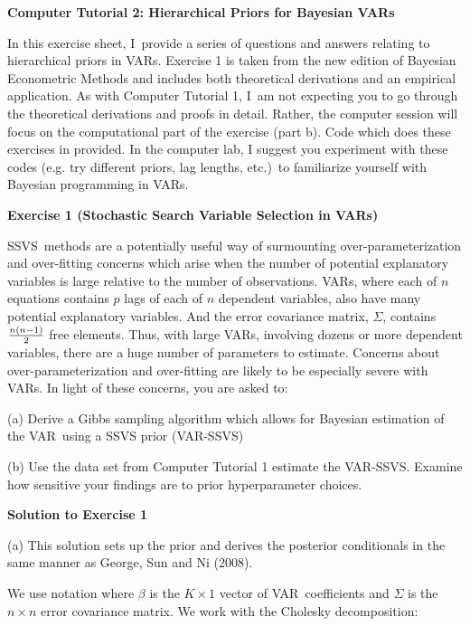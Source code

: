 \documentclass{article}
\begin{document}
\begin{center}
\textbf{Computer Tutorial 2: Hierarchical Priors for Bayesian VARs}
\end{center}

In this exercise sheet, I\ provide a series of questions and answers
relating to hierarchical priors in VARs. Exercise 1 is taken from the new
edition of Bayesian Econometric Methods and includes both theoretical
derivations and an empirical application. As with Computer Tutorial 1, I\ am
not expecting you to go through the theoretical derivations and proofs in
detail. Rather, the computer session will focus on the computational part of
the exercise (part b). Code which does these exercises in provided. In the
computer lab, I suggest you experiment with these codes (e.g. try different
priors, lag lengths, etc.)\ to familiarize yourself with Bayesian
programming in VARs.

\newpage

\textbf{Exercise 1 (Stochastic Search Variable Selection in VARs)}

SSVS\ methods are a potentially useful way of surmounting
over-parameterization and over-fitting concerns which arise when the number
of potential explanatory variables is large relative to the number of
observations. VARs, where each of $n$ equations contains $p$ lags of each of 
$n$ dependent variables, also have many potential explanatory variables. And
the error covariance matrix, $\Sigma $, contains $\frac{n\left( n-1\right) }{%
2}$ free elements. Thus, with large VARs, involving dozens or more dependent
variables, there are a huge number of parameters to estimate. Concerns about
over-parameterization and over-fitting are likely to be especially severe
with VARs. In light of these concerns, you are asked to:

(a) Derive a Gibbs sampling algorithm which allows for Bayesian estimation
of the VAR\ using a SSVS prior (VAR-SSVS)

(b) Use the data set from Computer Tutorial 1 estimate the VAR-SSVS. Examine
how sensitive your findings are to prior hyperparameter choices.

\textbf{Solution to Exercise 1}

(a) This solution sets up the prior and derives the posterior conditionals
in the same manner as George, Sun and Ni (2008).

We use notation where $\beta $ is the $K\times 1$ vector of VAR\
coefficients and $\Sigma $ is the $n\times n$ error covariance matrix. We
work with the Cholesky decomposition:
\end{document}
